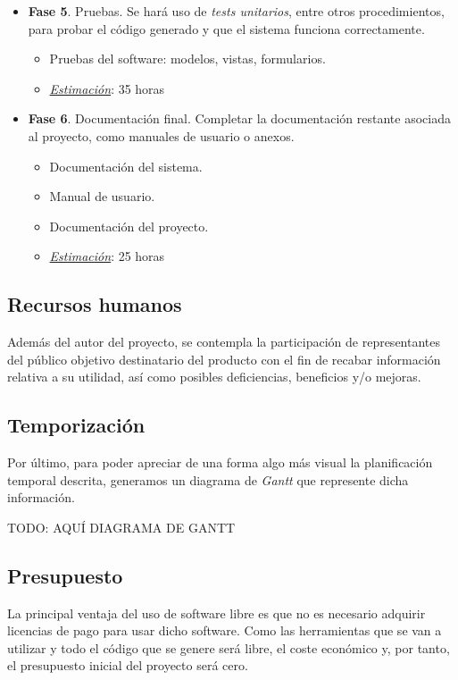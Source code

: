 \begin{itemize}
	\item \textbf{Fase 5}. Pruebas. Se hará uso de \textit{tests unitarios}, entre otros procedimientos, para probar el código generado y que el sistema funciona correctamente.
	\begin{itemize}
		\item Pruebas del software: modelos, vistas, formularios.
		\item \underline{\textit{Estimación}}: 35 horas
	\end{itemize}
	
	\item \textbf{Fase 6}. Documentación final. Completar la documentación restante asociada al proyecto, como manuales de usuario o anexos.
	\begin{itemize}
		\item Documentación del sistema.
		\item Manual de usuario.
		\item Documentación del proyecto.
		\item \underline{\textit{Estimación}}: 25 horas
	\end{itemize}
\end{itemize}

\subsection{Recursos humanos}

Además del autor del proyecto, se contempla la participación de representantes del público objetivo destinatario del producto con el fin de recabar información relativa a su utilidad, así como posibles deficiencias, beneficios y/o mejoras.


\subsection{Temporización}

Por último, para poder apreciar de una forma algo más visual la planificación temporal descrita, generamos un diagrama de \textit{Gantt} que represente dicha información.

TODO: AQUÍ DIAGRAMA DE GANTT

\subsection{Presupuesto}

La principal ventaja del uso de software libre es que no es necesario adquirir licencias de pago para usar dicho software. Como las herramientas que se van a utilizar y todo el código que se genere será libre, el coste económico y, por tanto, el presupuesto inicial del proyecto será cero.\\


